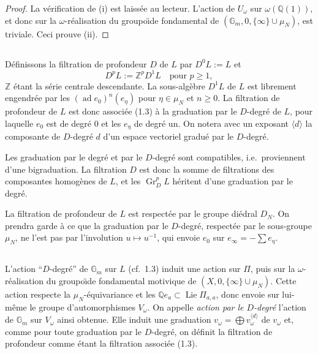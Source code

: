 \documentclass[11pt,a4paper]{article}
\theoremstyle{plain}
\theoremstyle{definition}
\DeclareMathOperator{\Lie}{Lie}
\DeclareMathOperator{\ad}{ad}
\newcommand{\Di}{D}
\newcommand{\Gm}{\mathbb{G}_m}
\newcommand{\Q}{\mathbb{Q}}
\newcommand{\Z}{\mathbb{Z}}
\newcommand{\Gr}{\operatorname{Gr}}
\begin{document}
\begin{proof}
La v\'erification de (i) est laiss\'ee au lecteur. L'action de $U_\omega$ sur $\omega(\Q(1))$, et donc sur la $\omega$-r\'ealisation du groupo\"{\i}de fondamental de $(\Gm, 0, \{\infty\} \cup \mu_N)$, est triviale. Ceci prouve (ii).
\end{proof}

\subsection{}
D\'efinissons la filtration de profondeur $D$ de $L$ par $D^0L := L$ et
\begin{equation}\label{eq:3.7.1}
D^pL := \Z^p D^1L \quad \text{pour }p \geq 1,
\end{equation}
$\Z$ \'etant la s\'erie centrale descendante. La sous-alg\`ebre $D^1L$ de $L$ est librement engendr\'ee par les $(\ad e_0)^n(e_\eta)$ pour $\eta \in \mu_N$ et $n \geq 0$. La filtration de profondeur de $L$ est donc associ\'ee (1.3) \`a la graduation par le $D$-degr\'e de $L$, pour laquelle $e_0$ est de degr\'e $0$ et les $e_\eta$ de degr\'e un. On notera avec un exposant $\langle d \rangle$ la composante de $D$-degr\'e $d$ d'un espace vectoriel gradu\'e par le $D$-degr\'e.

Les graduation par le degr\'e et par le $D$-degr\'e sont compatibles, i.e.~proviennent d'une bigraduation. La filtration $D$ est donc la somme de filtrations des composantes homog\`enes de $L$, et les $\Gr_D^p L$ h\'eritent d'une graduation par le degr\'e.

La filtration de profondeur de $L$ est respect\'ee par le groupe di\'edral $\Di_N$. On prendra garde \`a ce que la graduation par le $D$-degr\'e, respect\'ee par le sous-groupe $\mu_N$, ne l'est pas par l'involution $u \mapsto u^{-1}$, qui envoie $e_0$ sur $e_\infty = -\sum e_\eta$.

\subsection{}
L'action ``$D$-degr\'e'' de $\Gm$ sur $L$ (cf.~1.3) induit une action sur $\Pi$, puis sur la $\omega$-r\'ealisation du groupo\"{\i}de fondamental motivique de $(X, 0, \{\infty\} \cup \mu_N)$. Cette action respecte la $\mu_N$-\'equivariance et les $\Q e_a \subset \Lie \Pi_{a,a}$, donc envoie sur lui-m\^eme le groupe d'automorphismes $V_\omega$. On appelle {\em action par le $D$-degr\'e} l'action de $\Gm$ sur $V_\omega$ ainsi obtenue. Elle induit une graduation $v_\omega = \bigoplus v_\omega^{\langle d \rangle}$ de $v_\omega$ et, comme pour toute graduation par le $D$-degr\'e, on d\'efinit la filtration de profondeur comme \'etant la filtration associ\'ee (1.3).
\end{document}
